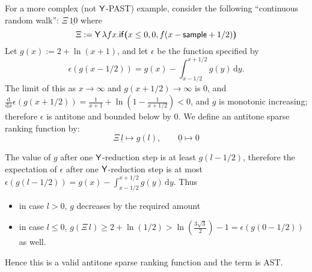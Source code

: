 For a more complex (not $\mathsf{Y}$-PAST) example, consider the following ``continuous random walk'': $\Xi \, \underline{10}$ where
\[
\Xi := \mathsf{Y} \, \lambda f x . \mathsf{if}\boldsymbol{(}x \leq 0, 0, f(x - \mathsf{sample} + 1/2)\boldsymbol{)} 
\]
Let $g(x) := 2 + \ln(x + 1)$, and let $\epsilon$ be the function specified by
\[
\epsilon(g(x-1/2)) = g(x) - \int_{x-1/2}^{x+1/2}g(y) \, \mathrm d y.
\]
The limit of this as $x \to \infty$ and $g(x+1/2) \to \infty$ is 0, and $\frac {\mathrm d}{\mathrm dx} \epsilon(g(x+1/2)) = \frac 1 {x+1} + \ln(1 - \frac 1 {x + 1/2}) < 0$, and $g$ is monotonic increasing; 
therefore $\epsilon$ is antitone and bounded below by 0.
We define an antitone sparse ranking function by:
\[
\Xi \, \underline l 
\mapsto 
g(l), \qquad 
\underline 0 \mapsto 0
\]

The value of $g$ after one $\mathsf{Y}$-reduction step is at least $g(l-1/2)$, therefore the expectation of $\epsilon$ after one $\mathsf{Y}$-reduction step is at most $\epsilon(g(l-1/2)) = g(x) - \int_{x-1/2}^{x+1/2}g(y) \, \mathrm d y$. 
Thus 
\begin{itemize}
\item in case $l > 0$, $g$ decreases by the required amount
\item in case $l \leq 0$, 
\(
g(\Xi \, l) \geq 2 + \ln(1/2) > \ln(\frac{3 \sqrt 3} 2) - 1 = \epsilon(g(0-1/2))
\) 
as well.
\end{itemize}
Hence this is a valid antitone sparse ranking function and the term is AST.


